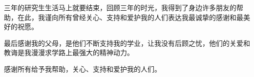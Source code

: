 
\begin{acknowledgment}

三年的研究生生活马上就要结束，回顾三年的时光，我得到了身边许多朋友的帮助，在此，我谨向所有曾经关心、支持和爱护我的人们表达我最诚挚的感谢和最美好的祝愿。

最后感谢我的父母，是他们不断支持我的学业，让我没有后顾之忧，他们的关爱和教诲是我漫漫求学路上最强大的精神动力。

感谢所有给予我帮助，关心、支持和爱护我的人们。

\end{acknowledgment}

